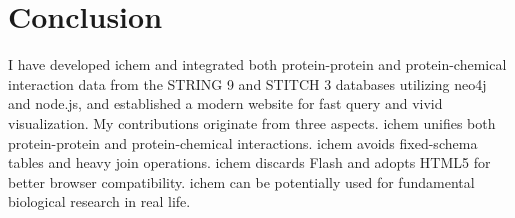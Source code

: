 \documentclass[10pt,conference,compsocconf]{IEEEtran}
\begin{document}
\section{Conclusion}

I have developed ichem and integrated both protein-protein and protein-chemical interaction data from the STRING 9 and STITCH 3 databases utilizing neo4j and node.js, and established a modern website for fast query and vivid visualization. My contributions originate from three aspects. ichem unifies both protein-protein and protein-chemical interactions. ichem avoids fixed-schema tables and heavy join operations. ichem discards Flash and adopts HTML5 for better browser compatibility. ichem can be potentially used for fundamental biological research in real life.



\end{document}
